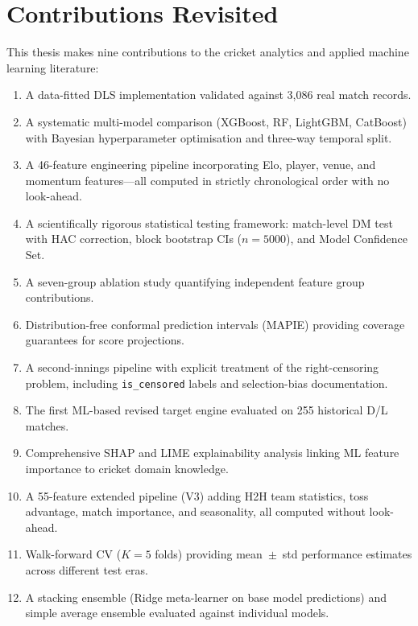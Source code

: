 \documentclass[12pt,a4paper,oneside]{report}
\begin{document}
\section{Contributions Revisited}

This thesis makes nine contributions to the cricket analytics and applied machine learning literature:

\begin{enumerate}
    \item A data-fitted DLS implementation validated against 3,086 real match records.
    \item A systematic multi-model comparison (XGBoost, RF, LightGBM, CatBoost) with Bayesian hyperparameter optimisation and three-way temporal split.
    \item A 46-feature engineering pipeline incorporating Elo, player, venue, and momentum features---all computed in strictly chronological order with no look-ahead.
    \item A scientifically rigorous statistical testing framework: match-level DM test with HAC correction, block bootstrap CIs ($n=5000$), and Model Confidence Set.
    \item A seven-group ablation study quantifying independent feature group contributions.
    \item Distribution-free conformal prediction intervals (MAPIE) providing coverage guarantees for score projections.
    \item A second-innings pipeline with explicit treatment of the right-censoring problem, including \texttt{is\_censored} labels and selection-bias documentation.
    \item The first ML-based revised target engine evaluated on 255 historical D/L matches.
    \item Comprehensive SHAP and LIME explainability analysis linking ML feature importance to cricket domain knowledge.

    \item A 55-feature extended pipeline (V3) adding H2H team statistics, toss advantage, match importance, and seasonality, all computed without look-ahead.

    \item Walk-forward CV ($K=5$ folds) providing mean~$\pm$~std performance estimates across different test eras.

    \item A stacking ensemble (Ridge meta-learner on base model predictions) and simple average ensemble evaluated against individual models.


\end{enumerate}
\end{document}
